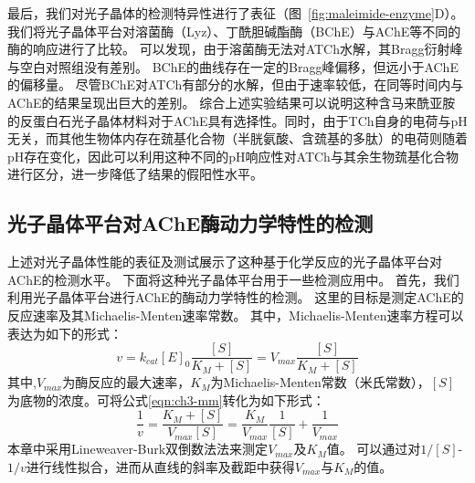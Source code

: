 最后，我们对光子晶体的检测特异性进行了表征（图~\ref{fig:maleimide-enzyme}D）。我们将光子晶体平台对溶菌酶（Lyz）、丁酰胆碱酯酶（BChE）与AChE等不同的酶的响应进行了比较。
可以发现，由于溶菌酶无法对ATCh水解，其Bragg衍射峰与空白对照组没有差别。
BChE的曲线存在一定的Bragg峰偏移，但远小于AChE的偏移量。
尽管BChE对ATCh有部分的水解，但由于速率较低，在同等时间内与AChE的结果呈现出巨大的差别。
综合上述实验结果可以说明这种含马来酰亚胺的反蛋白石光子晶体材料对于AChE具有选择性。同时，由于TCh自身的电荷与pH无关，而其他生物体内存在巯基化合物（半胱氨酸、含巯基的多肽）的电荷则随着pH存在变化，因此可以利用这种不同的pH响应性对ATCh与其余生物巯基化合物进行区分\cite{Yang2013MaleimideContaining}，进一步降低了结果的假阳性水平。

\subsection{光子晶体平台对AChE酶动力学特性的检测}
上述对光子晶体性能的表征及测试展示了这种基于化学反应的光子晶体平台对AChE的检测水平。
下面将这种光子晶体平台用于一些检测应用中。
首先，我们利用光子晶体平台进行AChE的酶动力学特性的检测。
这里的目标是测定AChE的反应速率及其Michaelis-Menten速率常数。
其中，Michaelis-Menten速率方程可以表达为如下的形式：
\begin{equation}
	\label{eqn:ch3-mm}
	v=k_{cat}[E]_0\frac{[S]}{K_M+[S]}=V_{max}\frac{[S]}{K_M+[S]}
\end{equation}
其中,$V_{max}$为酶反应的最大速率，$K_M$为Michaelis-Menten常数（米氏常数），$[S]$为底物的浓度。可将公式\ref{eqn:ch3-mm}转化为如下形式：
\begin{equation}
	\label{eqn:ch3-LB}
	\frac{1}{v}=\frac{K_M+[S]}{V_{max}[S]}=\frac{K_M}{V_{max}}\frac{1}{[S]}+\frac{1}{V_{max}}
\end{equation}
本章中采用Lineweaver-Burk双倒数法法来测定$V_{max}$及$K_M$值。
可以通过对$1/[S]$-$1/v$进行线性拟合，进而从直线的斜率及截距中获得$V_{max}$与$K_M$的值。

